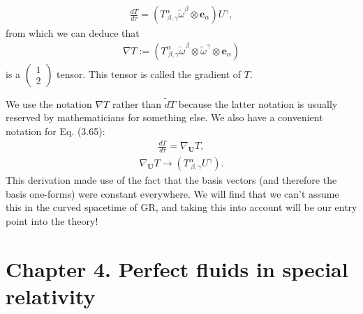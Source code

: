 \documentclass[11pt,letterpaper]{book}
\begin{document}
    \begin{align}
    \frac{dT}{d\tau} = \left(T^\alpha_{\ \beta, \gamma} \tilde{\omega}^\beta \otimes \mathbf{e}_\alpha\right) U^\gamma, \tag{3.65}
    \end{align}
    from which we can deduce that
    \begin{align}
    \nabla T := \left(T^\alpha_{\ \beta, \gamma} \tilde{\omega}^\beta \otimes \tilde{\omega}^\gamma \otimes \mathbf{e}_\alpha\right) \tag{3.66}
    \end{align}
    is a \(\left(\begin{array}{c} 1 \\ 2 \end{array}\right)\) tensor. This tensor is called the gradient of \(T\).
    
    We use the notation \(\nabla T\) rather than \(\tilde{d}T\) because the latter notation is usually reserved by mathematicians for something else. We also have a convenient notation for Eq. (3.65):
    \begin{align}
    \frac{dT}{d\tau} = \nabla_{\mathbf{U}} T, \tag{3.67}
    \end{align}
    \begin{align}
    \nabla_{\mathbf{U}} T \rightarrow \left(T^\alpha_{\ \beta, \gamma} U^\gamma\right). \tag{3.68}
    \end{align}
    This derivation made use of the fact that the basis vectors (and therefore the basis one-forms) were constant everywhere. We will find that we can’t assume this in the curved spacetime of GR, and taking this into account will be our entry point into the theory!
    
\section{Chapter 4. Perfect fluids in special relativity}
\end{document}
